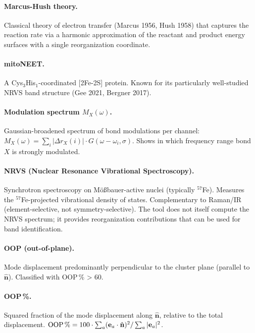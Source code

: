 \documentclass[11pt,a4paper,twoside]{article}
\theoremstyle{remark}
\begin{document}
\paragraph{Marcus-Hush theory.}
Classical theory of electron transfer (Marcus 1956, Hush 1958)
that captures the reaction rate via a harmonic approximation of
the reactant and product energy surfaces with a single
reorganization coordinate.

\paragraph{mitoNEET.}
A Cys$_3$His$_1$-coordinated [2Fe-2S] protein. Known for its
particularly well-studied NRVS band structure
(Gee 2021, Bergner 2017).

\paragraph{Modulation spectrum $M_X(\omega)$.}
Gaussian-broadened spectrum of bond modulations per channel:
$M_X(\omega) = \sum_i |\Delta r_X(i)| \cdot G(\omega - \omega_i,
\sigma)$. Shows in which frequency range bond $X$ is strongly
modulated.

\paragraph{NRVS (Nuclear Resonance Vibrational Spectroscopy).}
Synchrotron spectroscopy on M\"o{\ss}bauer-active nuclei
(typically $^{57}$Fe). Measures the $^{57}$Fe-projected
vibrational density of states. Complementary to Raman/IR
(element-selective, not symmetry-selective). The tool does not
itself compute the NRVS spectrum; it provides reorganization
contributions that can be used for band identification.

\paragraph{OOP (out-of-plane).}
Mode displacement predominantly perpendicular to the cluster plane
(parallel to $\hat{\mathbf{n}}$). Classified with OOP\,\% > 60.

\paragraph{OOP\,\%.}
Squared fraction of the mode displacement along
$\hat{\mathbf{n}}$, relative to the total displacement.
$\text{OOP\,\%} = 100 \cdot \sum_a (\mathbf{e}_a \cdot
\hat{\mathbf{n}})^2 / \sum_a |\mathbf{e}_a|^2$.
\end{document}
